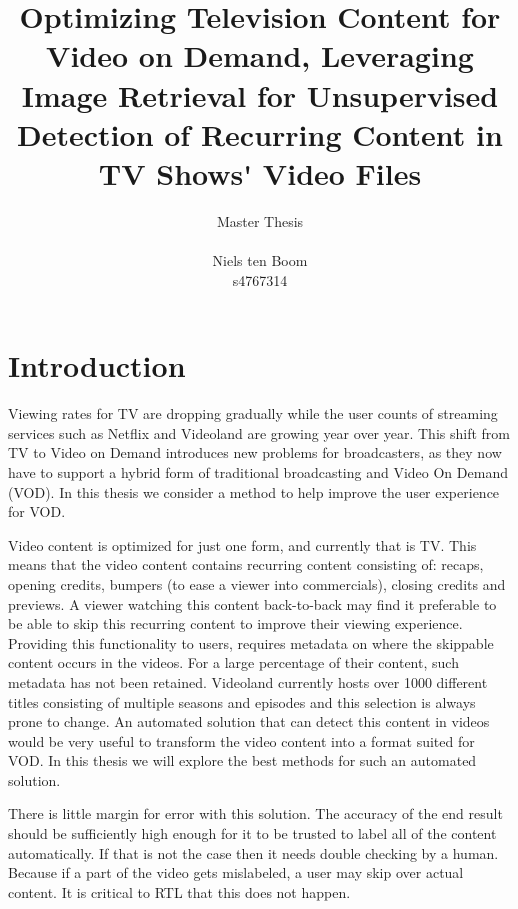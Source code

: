 \documentclass{article}
\begin{document}
\title{Optimizing Television Content for Video on Demand, Leveraging Image Retrieval for Unsupervised Detection of Recurring Content in TV Shows\'{} Video Files}
\author{Master Thesis\\ \\ Niels ten Boom  \\ s4767314}

\date{\vspace{-3ex}}

\maketitle
\newpage

\tableofcontents
\newpage

\section{Introduction} \label{introduction}
Viewing rates for TV are dropping gradually while the user counts of streaming services such as Netflix and Videoland are growing year over year. This shift from TV to Video on Demand introduces new problems for broadcasters, as they now have to support a hybrid form of traditional broadcasting and Video On Demand (VOD). In this thesis we consider a method to help improve the user experience for VOD.

Video content is optimized for just one form, and currently that is TV. This means that the video content contains recurring content consisting of: recaps, opening credits, bumpers (to ease a viewer into commercials), closing credits and previews. A viewer watching this content back-to-back may find it preferable to be able to skip this recurring content to improve their viewing experience. Providing this functionality to users, requires metadata on where the skippable content occurs in the videos. For a large percentage of their content, such metadata has not been retained. Videoland currently hosts over 1000 different titles consisting of multiple seasons and episodes and this selection is always prone to change. An automated solution that can detect this content in videos would be very useful to transform the video content into a format suited for VOD. In this thesis we will explore the best methods for such an automated solution.

There is little margin for error with this solution. The accuracy of the end result should be sufficiently high enough for it to be trusted to label all of the content automatically. If that is not the case then it needs double checking by a human. Because if a part of the video gets mislabeled, a user may skip over actual content. It is critical to RTL that this does not happen.
\end{document}

